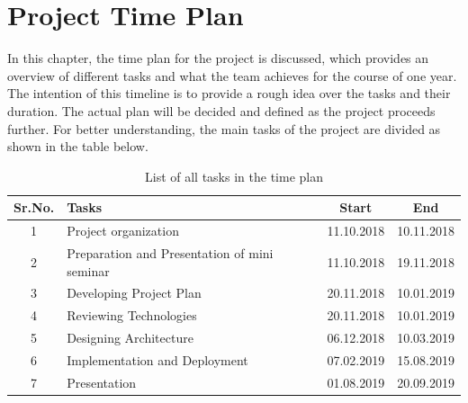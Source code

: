 \chapter{Project Time Plan}
\label{ch:Project Time Plan}

In this chapter, the time plan for the project is discussed, which provides an overview of different tasks and what the team achieves for the course of one year. The intention of this timeline is to provide a rough idea over the tasks and their duration. The actual plan will be decided and defined as the project proceeds further. For better understanding, the main tasks of the project are divided as shown in the table below.

\begin{table} [h]
\centering
	\begin{tabular}{|c|l|c|c|}
	\hline
		Sr.No. & Tasks & Start & End\\
		\hline
		1 &	Project organization & 11.10.2018 &	10.11.2018\\
		\hline
		2 &	Preparation and Presentation of mini seminar & 11.10.2018 &	19.11.2018\\
		\hline
		3 &	Developing Project Plan & 20.11.2018 & 10.01.2019\\
		\hline
		4 &	Reviewing Technologies & 20.11.2018 & 10.01.2019\\
		\hline
		5 &	Designing Architecture &	06.12.2018 & 10.03.2019\\
		\hline
		6 & Implementation and Deployment &	07.02.2019 & 15.08.2019\\
		\hline
		7 & Presentation &	01.08.2019 & 20.09.2019\\
		\hline
	\end{tabular}
\caption{List of all tasks in the time plan}
\end{table}

